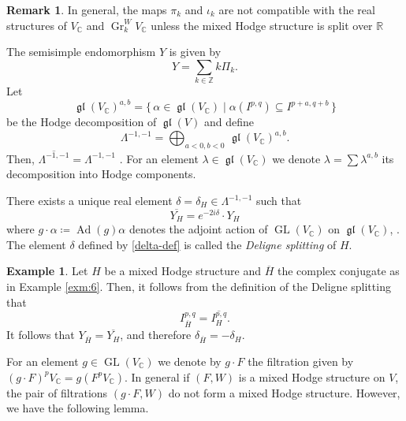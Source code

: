 \documentclass[11pt,a4paper]{amsart}
\newcommand{\C}{\mathds{C}}
\newcommand{\R}{\mathds{R}}
\newcommand{\Z}{\mathds{Z}}
\DeclareMathOperator {\Gr} {Gr}
\DeclareMathOperator{\GL}{GL}
\DeclareMathOperator{\gl}{\mathfrak{gl}}
\DeclareMathOperator{\Ad}{Ad}
\numberwithin{equation}{section}
\theoremstyle{plain}
\theoremstyle{definition}
\newtheorem{rmk}[prop]{Remark}
\newtheorem{ex}[prop]{Example}
\begin{document}
\begin{rmk} In general, the maps $\pi _{k}$ and $\iota_{k}$ are not
  compatible with the real structures of $V_{\C}$ and $\Gr_{k}^{W}V_{\C}$
  unless the mixed Hodge structure is split over $\R$
\end{rmk}
The semisimple endomorphism $Y$ is given by
\begin{equation}\label{eq:37}
  Y=\sum _{k\in \Z} k \Pi _{k}.
\end{equation}
Let
\begin{equation}
     \gl(V_{\C})^{a,b} = \{\,\alpha\in \gl(V_{\C})
        \mid \alpha(I^{p,q})\subseteq I^{p+a,q+b}\,\}
     \label{gl-hodge-comp}
\end{equation}
be the Hodge decomposition of $\gl(V)$ and define
\begin{equation}
     \Lambda^{-1,-1} = \bigoplus_{a<0,b<0}\, \gl(V_{\C })^{a,b}.
     \label{lambda-def}
\end{equation}
Then, $\overline{\Lambda^{-1,-1}} = \Lambda^{-1,-1}$
\cite[Eq.~2.19]{CKS:dhs}.
For an element $\lambda \in \gl(V_{\C})$ we denote $\lambda =\sum
\lambda ^{a,b}$ its decomposition into Hodge components. 

There exists a unique
real element $\delta = \delta_{H}\in\Lambda^{-1,-1}$ such that 
\begin{equation}
       \overline{Y_{H}} = e^{-2i\delta}\cdot Y_{H}  \label{delta-def}
\end{equation}
where $g\cdot \alpha \coloneqq \Ad(g)\alpha$ denotes the adjoint action of
$\GL(V_{\C })$
on $\gl(V_{\C })$, \cite[Prop 2.20]{CKS:dhs}. The element
$\delta$ defined by \eqref{delta-def}
is called the \emph{Deligne splitting} of $H$.

\begin{ex}\label{exm:7}
  Let $H$ be a mixed Hodge structure and $\overline H$ the complex
  conjugate as in Example \ref{exm:6}. Then, it follows from the
  definition of the Deligne splitting that
  \begin{displaymath}
    I^{p,q}_{\overline H}= \overline {I^{p,q}_{H}}.
  \end{displaymath}
  It follows that $Y_{\overline H}=\overline {Y_{H}}$, and therefore
  $\delta _{\overline H}=-\delta _{H}$.  
\end{ex}

For an element $g\in \GL(V_{\C})$ we denote by $g\cdot F$ the
filtration given by $(g\cdot F)^{p}V_{\C}=g(F^{p}V_{\C})$. In general if
$(F,W)$ is a mixed Hodge structure on $V$, the pair of filtrations
$(g\cdot F,W)$ do not form a mixed Hodge structure. However, we have
the following lemma. 
\end{document}

